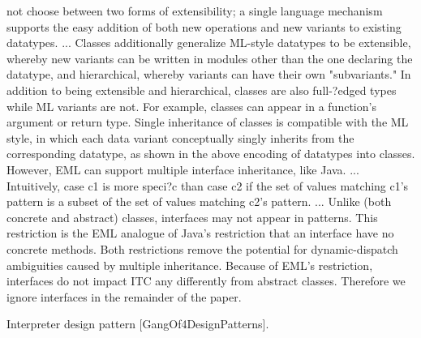 \documentclass[submission,copyright]{eptcs}
\begin{document}
not choose between two forms of extensibility; a single language mechanism
supports the easy addition of both new operations and new variants to existing
datatypes.
...
Classes additionally generalize ML-style datatypes to be extensible, whereby
new variants can be written in modules other than the one declaring the
datatype, and hierarchical, whereby variants can have their own "subvariants."
In addition to
being extensible and hierarchical, classes are also full-?edged types while ML
variants are not. For example, classes can appear in a function's argument or
return type.
Single inheritance of classes is compatible with the ML style, in which each 
data variant conceptually singly inherits from the corresponding datatype, as 
shown in the above encoding of datatypes into classes. However, EML can support 
multiple interface inheritance, like Java.
...
Intuitively, case c1
is more speci?c than case c2 if the set of values matching c1's pattern is a
subset of the set of values matching c2's pattern.
...
Unlike (both concrete and abstract) classes, interfaces may not appear in
patterns. This restriction is the EML analogue of Java's restriction that an interface have no concrete methods. Both restrictions remove the potential for
dynamic-dispatch ambiguities caused by multiple inheritance. Because of EML's
restriction, interfaces do not impact ITC any differently from abstract classes.
Therefore we ignore interfaces in the remainder of the paper.

Interpreter design pattern [GangOf4DesignPatterns].



\end{document}
